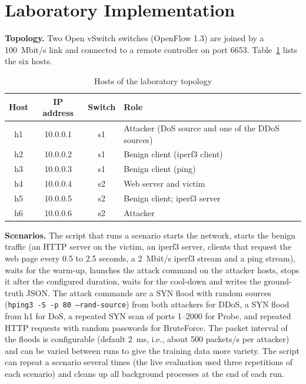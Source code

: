 \section{Laboratory Implementation}
\textbf{Topology.} Two Open vSwitch switches (OpenFlow 1.3) are joined by a 100~Mbit/s link and connected to a remote controller on port 6653. Table~\ref{tab:hosts} lists the six hosts.

\begin{table}[htbp]
\centering
\caption{Hosts of the laboratory topology}
\label{tab:hosts}
\begin{tabular}{|c|c|c|l|}
\hline
\textbf{Host} & \textbf{IP address} & \textbf{Switch} & \textbf{Role} \\ \hline
h1 & 10.0.0.1 & s1 & Attacker (DoS source and one of the DDoS sources) \\ \hline
h2 & 10.0.0.2 & s1 & Benign client (iperf3 client) \\ \hline
h3 & 10.0.0.3 & s1 & Benign client (ping) \\ \hline
h4 & 10.0.0.4 & s2 & Web server and victim \\ \hline
h5 & 10.0.0.5 & s2 & Benign client; iperf3 server \\ \hline
h6 & 10.0.0.6 & s2 & Attacker \\ \hline
\end{tabular}
\end{table}

\textbf{Scenarios.} The script that runs a scenario starts the network, starts the benign traffic (an HTTP server on the victim, an iperf3 server, clients that request the web page every 0.5 to 2.5 seconds, a 2~Mbit/s iperf3 stream and a ping stream), waits for the warm-up, launches the attack command on the attacker hosts, stops it after the configured duration, waits for the cool-down and writes the ground-truth JSON. The attack commands are a SYN flood with random sources (\texttt{hping3 -S -p 80 --rand-source}) from both attackers for DDoS, a SYN flood from h1 for DoS, a repeated SYN scan of ports 1--2000 for Probe, and repeated HTTP requests with random passwords for BruteForce. The packet interval of the floods is configurable (default 2~ms, i.e., about 500 packets/s per attacker) and can be varied between runs to give the training data more variety. The script can repeat a scenario several times (the live evaluation used three repetitions of each scenario) and cleans up all background processes at the end of each run.\\

